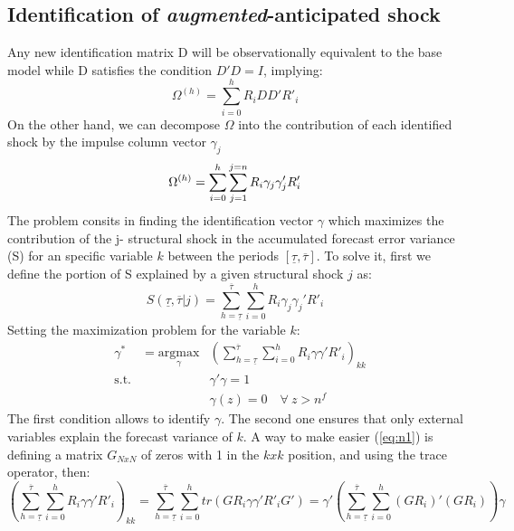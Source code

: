 \documentclass[12pt, a4paper]{article}
\begin{document}
\subsection{Identification of \textit{augmented}-anticipated shock}
Any new identification matrix D will be observationally equivalent to the base model while D satisfies the condition $D'D=I$, implying:
\begin{equation*}
	 \Omega^{(h)} = \sum_{i=0}^h R_{i}D D' R'_{i}
\end{equation*}
On the other hand, we can decompose $\Omega$ into the contribution of each identified shock by the impulse column vector $\gamma_j$
\begin{equation}{\label{eq:n2}}
	 \Omega^{(h)} = \sum_{i=0}^h \sum_{j=1}^{j=n} R_{i}\gamma_j \gamma_j' R'_{i}
\end{equation}
The problem consits in finding the identification vector $\gamma$ which maximizes the contribution of the j- structural shock in the accumulated forecast error variance (S) for an
specific variable $k$ between the periods $[\underline{\tau}, \overline{\tau}]$. To solve it, first we define the portion of S explained by a given structural shock $j$ as:
\begin{equation}
S(\underline{\tau},\overline{\tau}|j) =  \sum_{h = \underline{\tau}}^{\overline{\tau}}\sum_{i=0}^h R_{i}\gamma_j \gamma_j' R'_{i}
\end{equation}
Setting the maximization problem for the variable $k$:
\begin{equation}\label{eq:n1}
\begin{aligned}
& \gamma^* &= \underset{\gamma}{\text{argmax}}
& \left(\sum_{h = \underline{\tau}}^{\overline{\tau}}\sum_{i=0}^h R_{i}\gamma \gamma' R'_{i} \right)_{kk}\\
& \text{s.t.}
&  & \gamma' \gamma = 1 \\
&  & & \gamma(z)  = 0 \quad \forall \ z>n^f
\end{aligned}
\end{equation}
The first condition allows to identify $\gamma$. The second one ensures that only external variables explain the forecast variance of $k$. A way to make easier (\ref{eq:n1}) is defining a matrix $G_{NxN}$ of zeros with 1 in the $kxk$ position, and using the trace operator, then:
\begin{equation*}
\left(\sum_{h = \underline{\tau}}^{\overline{\tau}}\sum_{i=0}^h R_{i}\gamma \gamma' R'_{i} \right)_{kk}  = \sum_{h = \underline{\tau}}^{\overline{\tau}}\sum_{i=0}^h tr(G R_{i}\gamma \gamma' R'_{i} G') = \gamma' \left( \sum_{h =\underline{\tau}}^{\overline{\tau}}\sum_{i=0}^h  (G R_{i})'(G R_{i}) \right) \gamma
\end{equation*}
\end{document}
